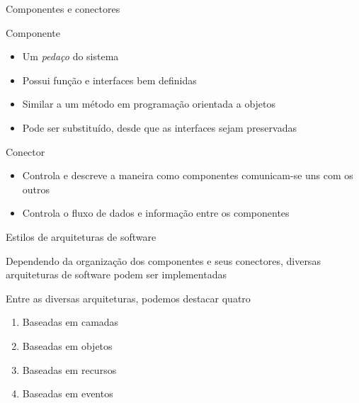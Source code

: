 \documentclass[compress]{beamer}
\begin{document}

\begin{frame}{Componentes e conectores}

Componente
\begin{itemize}
    \item Um \textit{pedaço} do sistema
    \item Possui função e interfaces bem definidas
    \item Similar a um método em programação orientada a objetos
    \item Pode ser substituído, desde que as interfaces sejam preservadas
\end{itemize}

\vspace{0.5cm}

Conector
\begin{itemize}
    \item Controla e descreve a maneira como componentes comunicam-se uns com os outros
    \item Controla o fluxo de dados e informação entre os componentes
\end{itemize}

\end{frame}


\begin{frame}{Estilos de arquiteturas de software}

Dependendo da organização dos componentes e seus conectores, diversas arquiteturas de software podem ser implementadas

\vspace{0.5cm}

Entre as diversas arquiteturas, podemos destacar quatro
\begin{enumerate}
    \item Baseadas em camadas
    \item Baseadas em objetos
    \item Baseadas em recursos
    \item Baseadas em eventos
\end{enumerate}

\end{frame}

\end{document}
